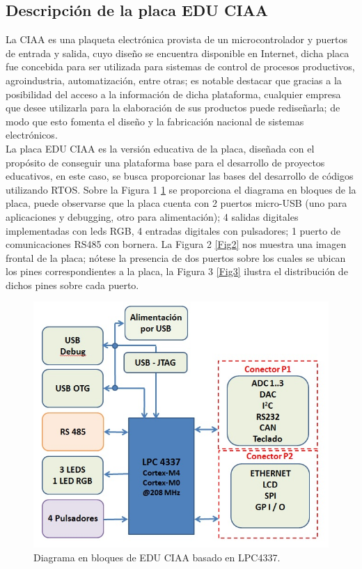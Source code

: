 \documentclass[conference]{IEEEtran}
\begin{document}
\subsection{Descripción de la placa EDU CIAA}
La CIAA es una plaqueta electrónica provista de un microcontrolador y puertos de entrada y salida, cuyo diseño se encuentra disponible en Internet, dicha placa fue concebida para ser utilizada para sistemas de control de procesos productivos, agroindustria, automatización, entre otras; es notable destacar que gracias a la posibilidad del acceso a la información de dicha plataforma, cualquier empresa que desee utilizarla para la elaboración de sus productos puede rediseñarla; de modo que esto fomenta el diseño y la fabricación nacional de sistemas electrónicos.\\



La placa EDU CIAA es la versión educativa de la placa, diseñada con el propósito de conseguir una plataforma base para el desarrollo de proyectos educativos, en este caso, se busca proporcionar las bases del desarrollo de códigos utilizando RTOS.
Sobre la Figura 1 \ref{Fig1} se proporciona el diagrama en bloques de la placa, puede observarse que la placa cuenta con 2 puertos micro-USB (uno para aplicaciones y debugging, otro para alimentación); 4 salidas digitales implementadas con leds RGB, 4 entradas digitales con pulsadores; 1 puerto de comunicaciones RS485 con bornera. La Figura 2 \ref{Fig2} nos muestra  una imagen frontal de la placa; nótese la presencia de dos puertos sobre los cuales se ubican los pines correspondientes a la placa, la Figura 3 \ref{Fig3} ilustra el distribución de dichos pines sobre cada puerto.


\begin{figure}[!t]
\centering
\includegraphics[width=8 cm]{figuras/diagramaenbloques.jpg}
\caption{Diagrama en bloques de EDU CIAA basado en LPC4337.}
\label{Fig1}
\end{figure}
\end{document}
